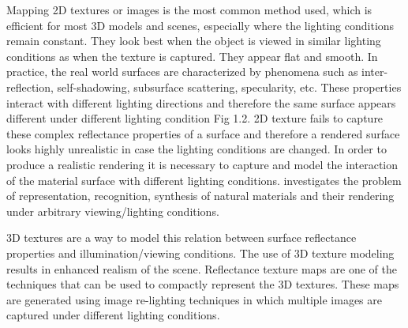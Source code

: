 
Mapping 2D textures or images is the most common method used, which is
efficient for most 3D models and scenes, especially where the lighting
conditions remain constant. They look best when the object is viewed in similar lighting conditions as
when the texture is captured. They appear flat and smooth.
In practice, the real world surfaces are
characterized by phenomena such as inter-reflection, self-shadowing, subsurface
scattering, specularity, etc. These properties interact with different lighting
directions and therefore the same surface appears different under
different lighting condition Fig 1.2. 2D texture fails to capture these complex reflectance properties of a 
surface and therefore a rendered surface looks highly unrealistic in case the lighting
conditions are changed. In order to produce a realistic rendering it is necessary to capture
and model the interaction of the material surface with different lighting
conditions. \cite{C1} investigates the problem of representation, recognition, synthesis of
natural materials and their rendering under arbitrary viewing/lighting conditions.






3D textures are a way to model this relation between surface reflectance
properties and illumination/viewing conditions.
The use of 3D texture modeling
results in enhanced realism of the scene. Reflectance texture maps are one of
the techniques that can be used to compactly represent the 3D textures. These
maps are generated using image re-lighting techniques \cite{C5,C4,C2} in which
multiple images are captured under different lighting conditions.


